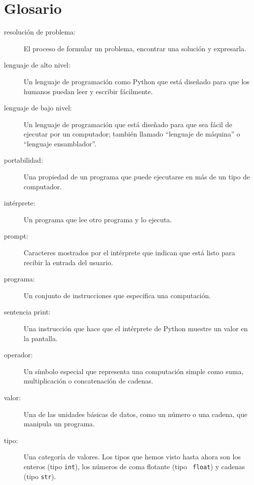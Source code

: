 \documentclass[10pt]{book}
\begin{document}
\section{Glosario}

\begin{description}

\item[resolución de problema:]  El proceso de formular un problema, encontrar
una solución y expresarla.

\item[lenguaje de alto nivel:]  Un lenguaje de programación como Python que
está diseñado para que los humanos puedan leer y escribir fácilmente.

\item[lenguaje de bajo nivel:]  Un lenguaje de programación que está diseñado
para que sea fácil de ejecutar por un computador; también llamado ``lenguaje de máquina'' o
``lenguaje ensamblador''.

\item[portabilidad:]  Una propiedad de un programa que puede ejecutarse en más
de un tipo de computador.

\item[intérprete:]  Un programa que lee otro programa y lo
ejecuta.

\item[prompt:] Caracteres mostrados por el intérprete que indican
que está listo para recibir la entrada del usuario.

\item[programa:] Un conjunto de instrucciones que especifica una computación.

\item[sentencia print:]  Una instrucción que hace que el intérprete de Python
muestre un valor en la pantalla.

\item[operador:]  Un símbolo especial que representa una computación simple
como suma, multiplicación o concatenación de cadenas.

\item[valor:]  Una de las unidades básicas de datos, como un número o una cadena,
que manipula un programa.

\item[tipo:] Una categoría de valores.  Los tipos que hemos visto hasta ahora
son los enteros (tipo {\tt int}), los números de coma flotante (tipo {\tt
float}) y cadenas (tipo {\tt str}).


\end{description}
\end{document}
